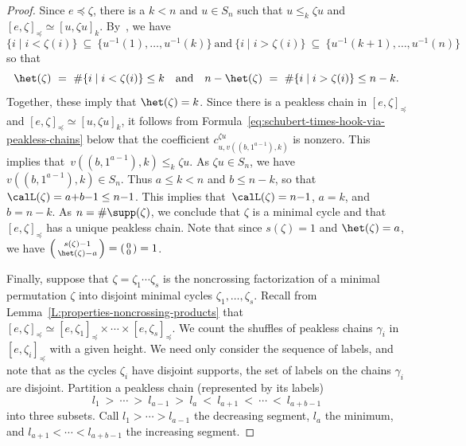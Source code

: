\begin{proof}
Since $e \preceq \zeta$, there is a $k < n$ and $u \in S_n$ such that $u \leq_k \zeta u$ and $[e, \zeta]_\preceq \simeq [u, \zeta u]_k$.
By~\cite[Thm.~3.1.5]{BS-Bruhat}, we have
\begin{equation*}
    \{i \mid i < \zeta(i)\}\ \subseteq\ \{u^{-1}(1), \ldots, u^{-1}(k)\}
    \ \text{and}\ 
    \{i \mid i > \zeta(i)\}\ \subseteq\ \{u^{-1}(k + 1), \ldots, u^{-1}(n)\}
\end{equation*}
so that
\begin{equation*}
    \het(\zeta)\ =\ \#\{i \mid i < \zeta(i)\} \leq k
    \quad\text{and}\quad
    n - \het(\zeta)\ =\ \#\{i \mid i > \zeta(i)\} \leq n - k.
\end{equation*}
Together, these imply that $\het(\zeta) = k$.
Since there is a peakless chain in $[e,\zeta]_\preceq$
and $[e,\zeta]_\preceq\simeq[u,\zeta u]_k$,
it follows from Formula~\eqref{eq:schubert-times-hook-via-peakless-chains}
below that the coefficient $c^{\zeta u}_{u, v((b,1^{a-1}),k)}$ is nonzero.
This implies that~$v((b,1^{a-1}),k)\leq_k \zeta u$.
As $\zeta u\in S_n$, we have $v((b,1^{a-1}),k)\in S_n$.
Thus $a\leq k<n$ and $b\leq n{-}k$, so that $\calL(\zeta)=a{+}b{-}1\leq n{-}1$.
This implies that~$\calL(\zeta)=n{-}1$, $a=k$, and $b=n{-}k$.
As $n=\#\supp(\zeta)$, we conclude that $\zeta$ is a minimal cycle
and that $[e, \zeta]_\preceq$ has a unique peakless chain.
Note that since $s(\zeta) = 1$ and $\het(\zeta) = a$, we have
$\left(\begin{smallmatrix} s(\zeta)-1 \\ \het(\zeta)-a \end{smallmatrix}\right)
= \left(\begin{smallmatrix} 0 \\ 0 \end{smallmatrix}\right) = 1$.

Finally, suppose that $\zeta=\zeta_1\dotsb\zeta_s$ is the noncrossing factorization of a minimal permutation $\zeta$ into disjoint minimal
cycles $\zeta_1,\dotsc,\zeta_s$.
Recall from Lemma~\ref{L:properties-noncrossing-products} that
$[e,\zeta]_\preceq \simeq  [e,\zeta_1]_\preceq \times \dotsb \times  [e,\zeta_s]_\preceq.$
We count the shuffles of peakless chains $\gamma_i$ in $[e,\zeta_i]_\preceq$ with a given height.
We need only consider the sequence of labels, and note that as the cycles $\zeta_i$ have disjoint supports, the set of labels on
the chains $\gamma_i$ are disjoint.
Partition a peakless chain (represented by its labels)
\begin{equation}\label{Eq:Peakless_Partition}
    l_1\ >\ \dotsb\ >\ l_{a-1} \ >\  l_a\ <\ l_{a+1}\ <\ \dotsb\ <\ l_{a+b-1}
\end{equation}
into three subsets.
Call $l_1> \dotsb>l_{a-1}$ the decreasing segment, $l_a$ the minimum, and
$l_{a+1} <\dotsb<l_{a+b-1}$ the increasing segment.


\end{proof}
